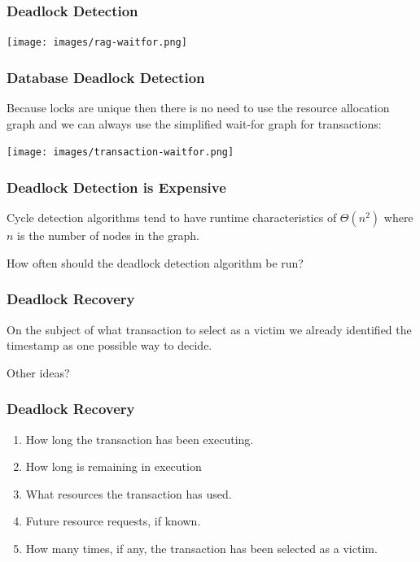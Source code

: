 \begin{frame}
\frametitle{Deadlock Detection}

\begin{center}
\texttt{[image: images/rag-waitfor.png]}
\end{center}


\end{frame}


\begin{frame}
\frametitle{Database Deadlock Detection}

Because locks are unique then there is no need to use the resource allocation graph and we can always use the simplified wait-for graph for transactions:

\begin{center}
\texttt{[image: images/transaction-waitfor.png]}
\end{center}


\end{frame}

\begin{frame}
\frametitle{Deadlock Detection is Expensive}

Cycle detection algorithms tend to have runtime characteristics of $\Theta(n^{2})$ where $n$ is the number of nodes in the graph.

How often should the deadlock detection algorithm be run?


\end{frame}

\begin{frame}
\frametitle{Deadlock Recovery}

On the subject of what transaction to select as a victim we already identified the timestamp as one possible way to decide. 

Other ideas?

\end{frame}

\begin{frame}
\frametitle{Deadlock Recovery}

\begin{enumerate}
\item How long the transaction has been executing.
	\item How long is remaining in execution	
	\item What resources the transaction has used.
	\item Future resource requests, if known.
	\item How many times, if any, the transaction has been selected as a victim.
\end{enumerate}

\end{frame}


